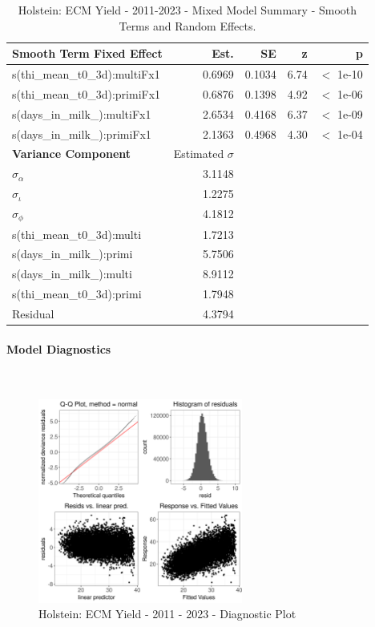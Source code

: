 \newpage
\begin{table}[H]
\centering
\begin{tabular}
{l | r | r | r | r}
\textbf{Smooth Term Fixed Effect} & Est. & SE & z & p\\
\hline
\hline
s(thi\_mean\_t0\_3d):multiFx1 & 0.6969 & 0.1034 & 6.74 & $<$ 1e-10 \\
s(thi\_mean\_t0\_3d):primiFx1 & 0.6876 & 0.1398 & 4.92 & $<$ 1e-06 \\
s(days\_in\_milk\_):multiFx1 & 2.6534 & 0.4168 & 6.37 & $<$ 1e-09 \\
s(days\_in\_milk\_):primiFx1 & 2.1363 & 0.4968 & 4.30 & $<$ 1e-04\\
\hline
\textbf{Variance Component} & Estimated $\sigma$ & & & \\
\hline
\hline
$\sigma_\alpha$ & 3.1148 & &  & \\
$\sigma_\iota$ & 1.2275 & & & \\
$\sigma_\phi$ & 4.1812 & & & \\
s(thi\_mean\_t0\_3d):multi & 1.7213 & & & \\
s(days\_in\_milk\_):primi & 5.7506 & & & \\
s(days\_in\_milk\_):multi & 8.9112 & & & \\
s(thi\_mean\_t0\_3d):primi & 1.7948 & & & \\
Residual & 4.3794 & & & \\
\end{tabular}
\caption[]{Holstein: ECM Yield - 2011-2023 - Mixed Model Summary - Smooth Terms and Random Effects.}
\end{table}


\paragraph{Model Diagnostics} \quad \\
\begin{figure}[H]
    \centering
    \includegraphics[width=0.6\textwidth]{thesis/figures/models/ecm/after2010/ho_ecm_after2010/ho_ecm_after2010_diagnostics.png}
    \caption[]{Holstein: ECM Yield - 2011 - 2023 - Diagnostic Plot}
\end{figure}

